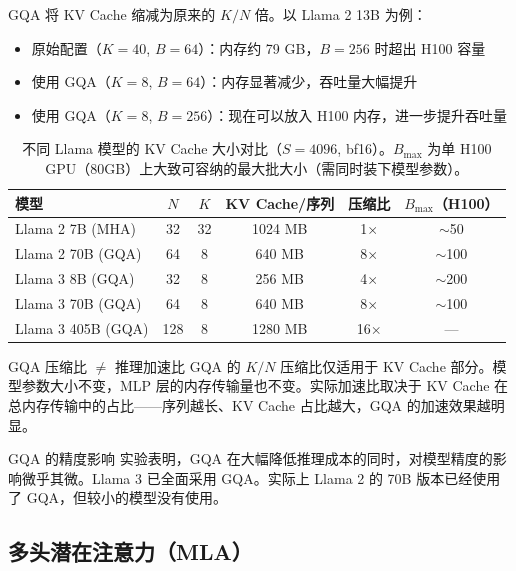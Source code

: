 \documentclass[a4paper]{article}
\begin{document}
GQA 将 KV Cache 缩减为原来的 $K/N$ 倍。以 Llama 2 13B 为例：

\begin{itemize}
    \item 原始配置（$K=40$, $B=64$）：内存约 79 GB，$B=256$ 时超出 H100 容量
    \item 使用 GQA（$K=8$, $B=64$）：内存显著减少，吞吐量大幅提升
    \item 使用 GQA（$K=8$, $B=256$）：现在可以放入 H100 内存，进一步提升吞吐量
\end{itemize}

\begin{table}[H]
\centering
\begin{tabular}{lccccc}
\toprule
\textbf{模型} & \textbf{$N$} & \textbf{$K$} & \textbf{KV Cache/序列} & \textbf{压缩比} & \textbf{$B_\text{max}$（H100）} \\
\midrule
Llama 2 7B (MHA) & 32 & 32 & 1024 MB & 1$\times$ & $\sim$50 \\
Llama 2 70B (GQA) & 64 & 8 & 640 MB & 8$\times$ & $\sim$100 \\
Llama 3 8B (GQA) & 32 & 8 & 256 MB & 4$\times$ & $\sim$200 \\
Llama 3 70B (GQA) & 64 & 8 & 640 MB & 8$\times$ & $\sim$100 \\
Llama 3 405B (GQA) & 128 & 8 & 1280 MB & 16$\times$ & --- \\
\bottomrule
\end{tabular}
\caption{不同 Llama 模型的 KV Cache 大小对比（$S=4096$, bf16）。$B_\text{max}$ 为单 H100 GPU（80GB）上大致可容纳的最大批大小（需同时装下模型参数）。}
\end{table}

\begin{warningbox}{GQA 压缩比 $\neq$ 推理加速比}
GQA 的 $K/N$ 压缩比仅适用于 KV Cache 部分。模型参数大小不变，MLP 层的内存传输量也不变。实际加速比取决于 KV Cache 在总内存传输中的占比——序列越长、KV Cache 占比越大，GQA 的加速效果越明显。
\end{warningbox}

\begin{knowledgebox}{GQA 的精度影响}
实验表明，GQA 在大幅降低推理成本的同时，对模型精度的影响微乎其微。Llama 3 已全面采用 GQA。实际上 Llama 2 的 70B 版本已经使用了 GQA，但较小的模型没有使用。
\end{knowledgebox}

\subsection{多头潜在注意力（MLA）}
\end{document}
